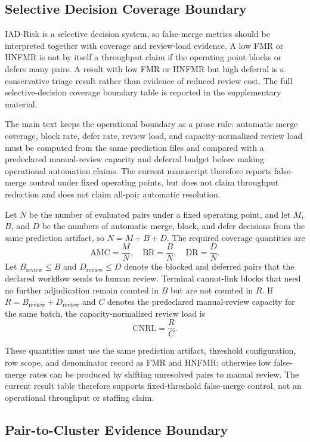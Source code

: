 \documentclass[preprint,12pt]{elsarticle}
\begin{document}
\subsection{Selective Decision Coverage Boundary}

IAD-Risk is a selective decision system, so false-merge metrics should be interpreted together with coverage and review-load evidence. A low FMR or HNFMR is not by itself a throughput claim if the operating point blocks or defers many pairs. A result with low FMR or HNFMR but high deferral is a conservative triage result rather than evidence of reduced review cost. The full selective-decision coverage boundary table is reported in the supplementary material.

The main text keeps the operational boundary as a prose rule: automatic merge coverage, block rate, defer rate, review load, and capacity-normalized review load must be computed from the same prediction files and compared with a predeclared manual-review capacity and deferral budget before making operational automation claims. The current manuscript therefore reports false-merge control under fixed operating points, but does not claim throughput reduction and does not claim all-pair automatic resolution.

Let $N$ be the number of evaluated pairs under a fixed operating point, and let $M$, $B$, and $D$ be the numbers of automatic merge, block, and defer decisions from the same prediction artifact, so $N=M+B+D$. The required coverage quantities are
\[
\mathrm{AMC}=\frac{M}{N},\quad
\mathrm{BR}=\frac{B}{N},\quad
\mathrm{DR}=\frac{D}{N}.
\]
Let $B_{\mathrm{review}}\leq B$ and $D_{\mathrm{review}}\leq D$ denote the blocked and deferred pairs that the declared workflow sends to human review. Terminal cannot-link blocks that need no further adjudication remain counted in $B$ but are not counted in $R$. If $R=B_{\mathrm{review}}+D_{\mathrm{review}}$ and $C$ denotes the predeclared manual-review capacity for the same batch, the capacity-normalized review load is
\[
\mathrm{CNRL}=\frac{R}{C}.
\]

These quantities must use the same prediction artifact, threshold configuration, row scope, and denominator record as FMR and HNFMR; otherwise low false-merge rates can be produced by shifting unresolved pairs to manual review. The current result table therefore supports fixed-threshold false-merge control, not an operational throughput or staffing claim.

\subsection{Pair-to-Cluster Evidence Boundary}
\end{document}
